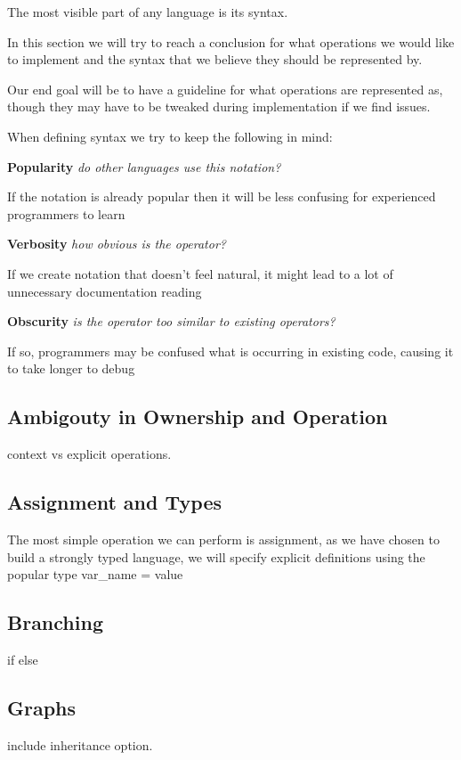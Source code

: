 The most visible part of any language is its syntax.

In this section we will try to reach a conclusion for what operations we would like to implement and the syntax
that we believe they should be represented by.

Our end goal will be to have a guideline for what operations are represented as, though they may have to be tweaked
during implementation if we find issues.

\bigskip

\noindent
When defining syntax we try to keep the following in mind:

\noindent
\textbf{Popularity} \- \textit{do other languages use this notation?}

If the notation is already popular then it will be less confusing for experienced programmers to learn

\noindent
\textbf{Verbosity} \- \textit{how obvious is the operator?}

If we create notation that doesn't feel natural, it might lead to a lot of unnecessary documentation reading

\noindent
\textbf{Obscurity} \- \textit{is the operator too similar to existing operators?}

If so, programmers may be confused what is occurring in existing code, causing it to take longer to debug

\subsection{Ambigouty in Ownership and Operation}
context vs explicit operations.

\subsection{Assignment and Types}
The most simple operation we can perform is assignment, as we have chosen to build a strongly typed language, we will
specify explicit definitions using the popular {type} {var_name} = {value}

\subsection{Branching}
if else

\subsection{Graphs}
include inheritance option.

